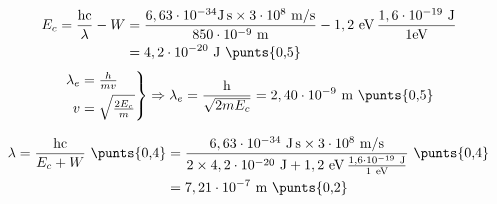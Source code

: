 \begin{solapartat}
\begin{align*}
E_c = \frac{\mathrm{hc}}{\lambda} - W &= \frac{6,63\cdot 10^{-34}\mathrm{J\,s}\times 3\cdot 10^{8}\ \mathrm{m/s}}{850\cdot 10^{-9}\ \mathrm{m}} - 1,2\ \mathrm{eV}\,\frac{1,6\cdot 10^{-19}\ \mathrm{J}}{1\mathrm{eV}}\\
&= 4,2\cdot 10^{-20}\ \mathrm{J} \ \text{\punts{0,5}}
\end{align*}
\[ \left.\begin{aligned} \lambda_e &= \tfrac{h}{mv}\\ v &= \sqrt{\tfrac{2E_c}{m}} \end{aligned}\right\}
\Rightarrow \lambda_e = \frac{\mathrm{h}}{\sqrt{2mE_c}} = 2,40\cdot 10^{-9}\ \mathrm{m} \ \text{\punts{0,5}} \]
\end{solapartat}

\begin{solapartat}
\begin{align*}
\lambda = \frac{\mathrm{hc}}{E_c + W} \ \text{\punts{0,4}} &= \frac{6,63\cdot 10^{-34}\ \mathrm{J\,s}\times 3\cdot 10^{8}\ \mathrm{m/s}}{2\times 4,2\cdot 10^{-20}\ \mathrm{J} + 1,2\ \mathrm{eV}\,\frac{1,6\cdot 10^{-19}\ \mathrm{J}}{1\ \mathrm{eV}}} \ \text{\punts{0,4}}\\
&= 7,21\cdot 10^{-7}\ \mathrm{m} \ \text{\punts{0,2}}
\end{align*}
\end{solapartat}
